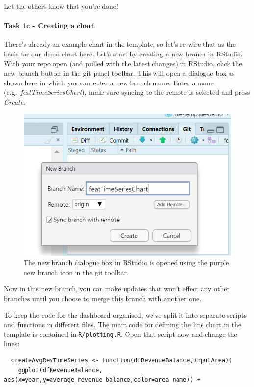 \documentclass[
  12pt,
]{article}
\begin{document}
Let the others know that you're done!

\hypertarget{task-1c---creating-a-chart}{%
\paragraph{Task 1c - Creating a
chart}\label{task-1c---creating-a-chart}}

There's already an example chart in the template, so let's re-wire that
as the basis for our demo chart here. Let's start by creating a new
branch in RStudio. With your repo open (and pulled with the latest
changes) in RStudio, click the new branch button in the git panel
toolbar. This will open a dialogue box as shown here in which you can
enter a new branch name. Enter a name (e.g.~\emph{featTimeSeriesChart}),
make sure syncing to the remote is selected and press \emph{Create}.

\begin{figure}

{\centering \includegraphics[width=0.64\linewidth]{images/gitdemo/gitdemo-RStudio_NewBranch} 

}

\caption{The new branch dialogue box in RStudio is opened using the purple new branch icon in the git toolbar.}\label{fig:unnamed-chunk-13}
\end{figure}

Now in this new branch, you can make updates that won't effect any other
branches until you choose to merge this branch with another one.

To keep the code for the dashboard organised, we've split it into
separate scripts and functions in different files. The main code for
defining the line chart in the template is contained in
\texttt{R/plotting.R}. Open that script now and change the lines:

\begin{verbatim}
  createAvgRevTimeSeries <- function(dfRevenueBalance,inputArea){
    ggplot(dfRevenueBalance, aes(x=year,y=average_revenue_balance,color=area_name)) + 
\end{verbatim}
\end{document}
